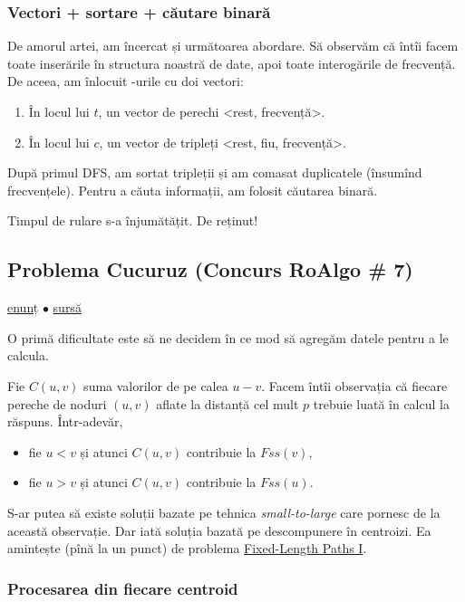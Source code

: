 \documentclass[../main.tex]{subfiles}
\begin{document}
\subsubsection*{Vectori + sortare + căutare binară}

De amorul artei, am încercat și următoarea abordare. Să observăm că întîi facem toate inserările în structura noastră de date, apoi toate interogările de frecvență. De aceea, am înlocuit -urile cu doi vectori:

\begin{enumerate}
  \item În locul lui $t$, un vector de perechi <rest, frecvență>.
  \item În locul lui $c$, un vector de tripleți <rest, fiu, frecvență>.
\end{enumerate}

După primul DFS, am sortat tripleții și am comasat duplicatele (însumînd frecvențele). Pentru a căuta informații, am folosit căutarea binară.

Timpul de rulare s-a înjumătățit. De reținut!


\subsection{Problema Cucuruz (Concurs RoAlgo \# 7)}
\label{problem:cucuruz}

\href{https://kilonova.ro/problems/1908}{enunț}
$\bullet$
\hyperref[code:cucuruz]{sursă}

O primă dificultate este să ne decidem în ce mod să agregăm datele pentru a le calcula.

Fie $C(u,v)$ suma valorilor de pe calea $u-v$. Facem întîi observația că fiecare pereche de noduri $(u, v)$ aflate la distanță cel mult $p$ trebuie luată în calcul la răspuns. Într-adevăr,

\begin{itemize}
  \item fie $u < v$ și atunci $C(u,v)$ contribuie la $Fss(v)$,
  \item fie $u > v$ și atunci $C(u,v)$ contribuie la $Fss(u)$.
\end{itemize}

S-ar putea să existe soluții bazate pe tehnica \textit{small-to-large} care pornesc de la această observație. Dar iată soluția bazată pe descompunere în centroizi. Ea amintește (pînă la un punct) de problema \hyperref[problem:fixed-length-paths-1]{Fixed-Length Paths I}.

\subsubsection*{Procesarea din fiecare centroid}
\end{document}
